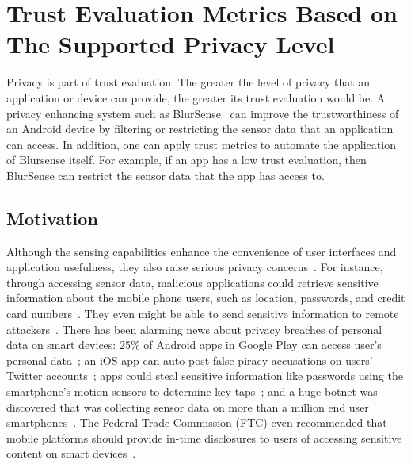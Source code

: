 \section{Trust Evaluation Metrics Based on The Supported Privacy Level}
\label{sec:blursense}
Privacy is part of trust evaluation.
The greater the level of privacy that an application or device can provide, the greater its trust evaluation would be.
A privacy enhancing system such as BlurSense~\cite{cappos2014blursense} can improve the trustworthiness of an Android device  
 by filtering or restricting the sensor data that an application can access.
In addition,
one can apply trust metrics to automate the application of Blursense itself.  For example, if an app has a low trust evaluation,
then BlurSense can restrict the sensor data that the app has access to.

\subsection{Motivation}
Although the sensing capabilities enhance the convenience of user interfaces and
application usefulness, they also raise serious privacy
concerns~\cite{shabtai2010google}. For instance, through accessing sensor data,
malicious applications could retrieve sensitive information about the mobile
phone users, such as location, passwords, and credit card numbers~\cite{xu2012taplogger, 
miluzzo2012tapprints, xu2009stealthy, cai2011touchlogger}. They
even might be able to send sensitive information to remote
attackers~\cite{schlegel2011soundcomber, marquardt2011sp}. There
has been alarming news about privacy breaches of personal data on smart devices:
25\% of Android apps in Google Play can access user's personal
data~\cite{toomuch}; an iOS app can auto-post false piracy accusations on users'
Twitter accounts~\cite{tweetios}; apps could steal sensitive information like
passwords using the smartphone's motion sensors to determine key 
taps~\cite{xu2012taplogger}; and a huge botnet was discovered that was collecting sensor data
on more than a million end user smartphones~\cite{botnet}. The
Federal Trade Commission (FTC) even recommended that mobile platforms should
provide in-time disclosures to users of accessing sensitive content on smart
devices~\cite{ftc}. 

